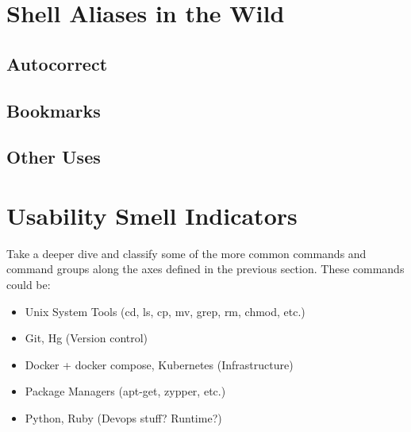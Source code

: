 \section{Shell Aliases in the Wild}






\subsection{Autocorrect}





\subsection{Bookmarks}

\subsection{Other Uses}


\section{Usability Smell Indicators}

Take a deeper dive and classify some of the more common commands and command groups along the axes defined in the previous section. These commands could be:
\begin{itemize}
	\item Unix System Tools (cd, ls, cp, mv, grep, rm, chmod, etc.)
	\item Git, Hg (Version control)
	\item Docker + docker compose, Kubernetes (Infrastructure)
	\item Package Managers (apt-get, zypper, etc.)
	\item Python, Ruby (Devops stuff? Runtime?)
\end{itemize}

